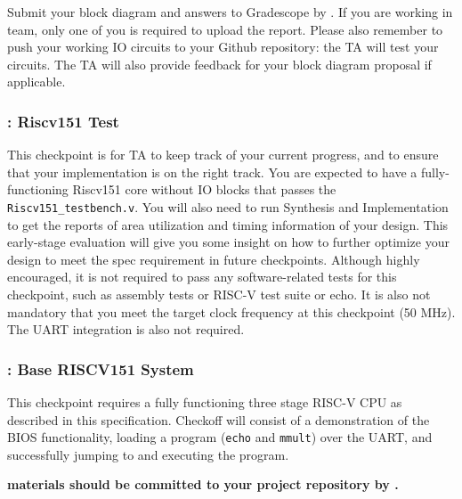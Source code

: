 \documentclass[11pt]{article}
\begin{document}
Submit your block diagram and answers to Gradescope by \blockDiagramDueDate. If you are working in team, only one of you is required to upload the report. Please also remember to push your working IO circuits to your Github repository: the TA will test your circuits. The TA will also provide feedback for your block diagram proposal if applicable.

\subsubsection{\ALUTaskName: Riscv151 Test}
This checkpoint is for TA to keep track of your current progress, and to ensure that your implementation is on the right track. You are expected to have a fully-functioning Riscv151 core without IO blocks that passes the \verb|Riscv151_testbench.v|. You will also need to run Synthesis and Implementation to get the reports of area utilization and timing information of your design. This early-stage evaluation will give you some insight on how to further optimize your design to meet the spec requirement in future checkpoints. Although highly encouraged, it is not required to pass any software-related tests for this checkpoint, such as assembly tests or RISC-V test suite or echo. It is also not mandatory that you meet the target clock frequency at this checkpoint (50 MHz). The UART integration is also not required.

\subsubsection{\baseCPUTaskName: Base RISCV151 System}
This checkpoint requires a fully functioning three stage RISC-V CPU as described in this specification.
Checkoff will consist of a demonstration of the BIOS functionality, loading a program (\verb|echo| and \verb|mmult|) over the UART, and successfully jumping to and executing the program.

\textbf{\baseCPUTaskName \space materials should be committed to your project repository by \baseCPUDueDate.}
\end{document}
